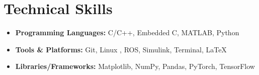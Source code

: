 \documentclass[letterpaper,11pt]{article}
\newcommand{\resumeItem}[1]{
  \item\small{
    {#1 \vspace{-2pt}}
  }
}
\newcommand{\resumeSubHeadingListEnd}{\end{itemize}}
\newcommand{\resumeItemListEnd}{\end{itemize}\vspace{-5pt}}
\begin{document}
 \vspace{-6pt}


%
\section{Technical Skills} %



\begingroup
  \footnotesize        %
  \begin{itemize}[leftmargin=0.15in,label={}, itemsep=-2pt, parsep=3pt]
    \item \textbf{Programming Languages:} C/C++, Embedded C, MATLAB, Python
    \item \textbf{Tools \& Platforms:} Git, Linux \faLinux, ROS, Simulink, \faTerminal Terminal, \LaTeX
    \item \textbf{Libraries/Frameworks:} Matplotlib, NumPy, Pandas, PyTorch, TensorFlow
  \end{itemize}
\endgroup





\end{document}
